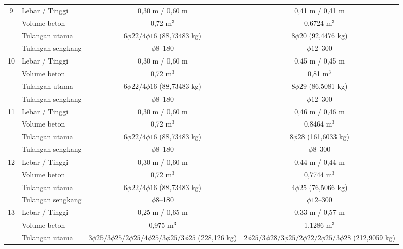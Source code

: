 \begin{landscape}
\begin{longtable}{clcccc}
9 & Lebar / Tinggi & \multicolumn{2}{c}{0,30 m / 0,60 m} & \multicolumn{2}{c}{0,41 m / 0,41 m} \\
  & Volume beton & \multicolumn{2}{c}{0,72 m$^3$} & \multicolumn{2}{c}{0,6724 m$^3$} \\
  & Tulangan utama & \multicolumn{2}{c}{$6\phi22/4\phi16$ (88,73483 kg)} & \multicolumn{2}{c}{$8\phi20$ (92,4476 kg)} \\
  & Tulangan sengkang & \multicolumn{2}{c}{$\phi8$--180} & \multicolumn{2}{c}{$\phi12$--300} \\
10 & Lebar / Tinggi & \multicolumn{2}{c}{0,30 m / 0,60 m} & \multicolumn{2}{c}{0,45 m / 0,45 m} \\
   & Volume beton & \multicolumn{2}{c}{0,72 m$^3$} & \multicolumn{2}{c}{0,81 m$^3$} \\
   & Tulangan utama & \multicolumn{2}{c}{$6\phi22/4\phi16$ (88,73483 kg)} & \multicolumn{2}{c}{$8\phi29$ (86,5081 kg)} \\
   & Tulangan sengkang & \multicolumn{2}{c}{$\phi8$--180} & \multicolumn{2}{c}{$\phi12$--300} \\
11 & Lebar / Tinggi & \multicolumn{2}{c}{0,30 m / 0,60 m} & \multicolumn{2}{c}{0,46 m / 0,46 m} \\
   & Volume beton & \multicolumn{2}{c}{0,72 m$^3$} & \multicolumn{2}{c}{0,8464 m$^3$} \\
   & Tulangan utama & \multicolumn{2}{c}{$6\phi22/4\phi16$ (88,73483 kg)} & \multicolumn{2}{c}{$8\phi28$ (161,6033 kg)} \\
   & Tulangan sengkang & \multicolumn{2}{c}{$\phi8$--180} & \multicolumn{2}{c}{$\phi8$--300} \\
12 & Lebar / Tinggi & \multicolumn{2}{c}{0,30 m / 0,60 m} & \multicolumn{2}{c}{0,44 m / 0,44 m} \\
   & Volume beton & \multicolumn{2}{c}{0,72 m$^3$} & \multicolumn{2}{c}{0,7744 m$^3$} \\
   & Tulangan utama & \multicolumn{2}{c}{$6\phi22/4\phi16$ (88,73483 kg)} & \multicolumn{2}{c}{$4\phi25$ (76,5066 kg)} \\
   & Tulangan sengkang & \multicolumn{2}{c}{$\phi8$--180} & \multicolumn{2}{c}{$\phi12$--300} \\
13 & Lebar / Tinggi & \multicolumn{2}{c}{0,25 m / 0,65 m} & \multicolumn{2}{c}{0,33 m / 0,57 m} \\
   & Volume beton & \multicolumn{2}{c}{0,975 m$^3$} & \multicolumn{2}{c}{1,1286 m$^3$} \\
   & Tulangan utama & \multicolumn{2}{c}{$3\phi25/3\phi25/2\phi25/4\phi25/3\phi25/3\phi25$ (228,126 kg)} & \multicolumn{2}{c}{$2\phi25/3\phi28/3\phi25/2\phi22/2\phi25/3\phi28$ (212,9059 kg)} \\

\end{longtable}
\end{landscape}
